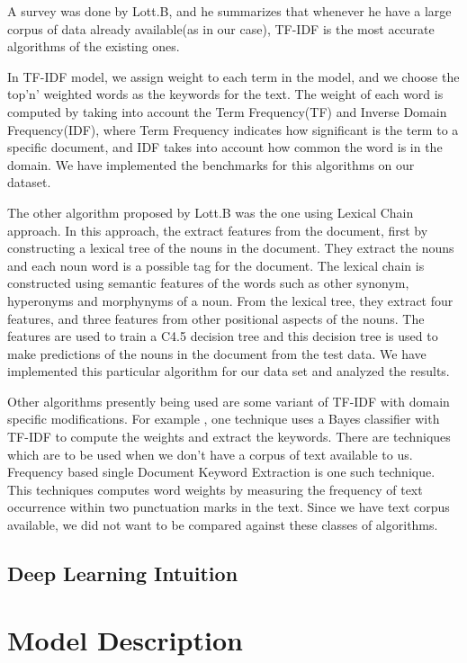 \documentclass[dvips,9pt]{article}
\begin{document}
		A survey was done by Lott.B\cite{lott2012survey}, and he summarizes that whenever he have a large corpus of data already available(as in our case), TF-IDF is the most accurate algorithms of the existing ones. 
		
		In TF-IDF model, we assign weight to each term in the model, and we choose the top'n' weighted words as the keywords for the text. The weight of each word is computed by taking into account the Term Frequency(TF) and Inverse Domain Frequency(IDF), where Term Frequency indicates how significant is the term to a specific document, and IDF takes into account how common the word is in the domain. We have implemented the benchmarks for this algorithms on our dataset.
		
		The other algorithm proposed by Lott.B was the one using Lexical Chain approach. In this approach, the extract features from the document, first by constructing a lexical tree of the nouns in the document. They extract the nouns and each noun word is a possible tag for the document. The lexical chain is constructed using semantic features of the words such as other synonym, hyperonyms and morphynyms of a noun. From the lexical tree, they extract four features, and three features from other positional aspects of the nouns. The features are used to train a C4.5 decision tree and this decision tree is used to make predictions of the nouns in the document from the test data. We have implemented this particular algorithm for our data set and analyzed the results.
		
		Other algorithms presently being used are some variant of TF-IDF with domain specific modifications. For example , one technique uses a Bayes classifier with TF-IDF to compute the weights and extract the keywords. 
		There are techniques which are to be used when we don't have a corpus of text available to us. Frequency based single Document Keyword Extraction is one such technique. This techniques computes word weights by measuring the frequency of text occurrence within two punctuation marks in the text. Since we have text corpus available, we did not want to be compared against these classes of algorithms.
		\subsection{Deep Learning Intuition}
	\section{Model Description}
\end{document}

